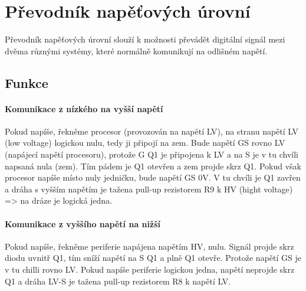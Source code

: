 \documentclass{template/socthesis}
\begin{document}
	\section*{Převodník napěťových úrovní}
	Převodník napěťových úrovní slouží k možnosti převádět digitální signál mezi dvěma různými systémy, které normálně komunikují na odlišném napětí.
	
	\subsection*{Funkce}
	
	\paragraph*{Komunikace z nízkého na vyšší napětí}
	Pokud napíše, řekněme procesor (provozován na napětí LV), na stranu napětí LV (low voltage) logickou nulu, tedy ji připojí na zem. Bude napětí GS rovno LV (napájecí napětí procesoru), protože G Q1 je připojena
	k LV a na S je v tu chvíli napsaná nula (zem). Tím pádem je Q1 otevřen a zem projde skrz Q1. Pokud však procesor napíše místo nuly jedničku, bude napětí GS 0V. V tu chvíli je Q1 zavřen a dráha s vyšším napětím je tažena pull-up rezistorem R9 k HV (hight voltage) => na dráze je logická jedna.
	
	\paragraph*{Komunikace z vyššího napětí na nižší}
	Pokud napíše, řekněme periferie napájena napětím HV, nulu. Signál projde skrz diodu uvnitř Q1, tím sníží napětí na S Q1 a plně Q1 otevře. Protože napětí GS je v tu chilli rovno LV. Pokud napíše periferie logickou jedna, napětí neprojde skrz Q1 a dráha LV-S je tažena pull-up rezistorem R8 k napětí LV.
	
	
\end{document}
